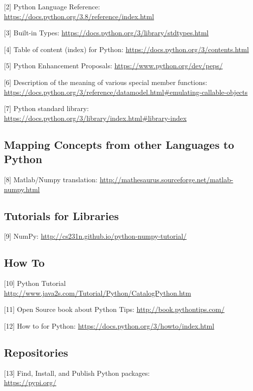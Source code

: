 \documentclass[
]{article}
\begin{document}
{[}2{]} Python Language Reference:
\url{https://docs.python.org/3.8/reference/index.html}

{[}3{]} Built-in Types:
\url{https://docs.python.org/3/library/stdtypes.html}

{[}4{]} Table of content (index) for Python:
\url{https://docs.python.org/3/contents.html}

{[}5{]} Python Enhancement Proposals:
\url{https://www.python.org/dev/peps/}

{[}6{]} Description of the meaning of various special member functions:
\url{https://docs.python.org/3/reference/datamodel.html\#emulating-callable-objects}

{[}7{]} Python standard library:
\url{https://docs.python.org/3/library/index.html\#library-index}

\hypertarget{mapping-concepts-from-other-languages-to-python}{%
\subsection{Mapping Concepts from other Languages to
Python}\label{mapping-concepts-from-other-languages-to-python}}

{[}8{]} Matlab/Numpy translation:
\url{http://mathesaurus.sourceforge.net/matlab-numpy.html}

\hypertarget{tutorials-for-libraries}{%
\subsection{Tutorials for Libraries}\label{tutorials-for-libraries}}

{[}9{]} NumPy: \url{http://cs231n.github.io/python-numpy-tutorial/}

\hypertarget{how-to}{%
\subsection{How To}\label{how-to}}

{[}10{]} Python Tutorial
\url{http://www.java2s.com/Tutorial/Python/CatalogPython.htm}

{[}11{]} Open Source book about Python Tips:
\url{http://book.pythontips.com/}

{[}12{]} How to for Python:
\url{https://docs.python.org/3/howto/index.html}

\hypertarget{repositories}{%
\subsection{Repositories}\label{repositories}}

{[}13{]} Find, Install, and Publish Python packages:\\
\url{https://pypi.org/}
\end{document}
